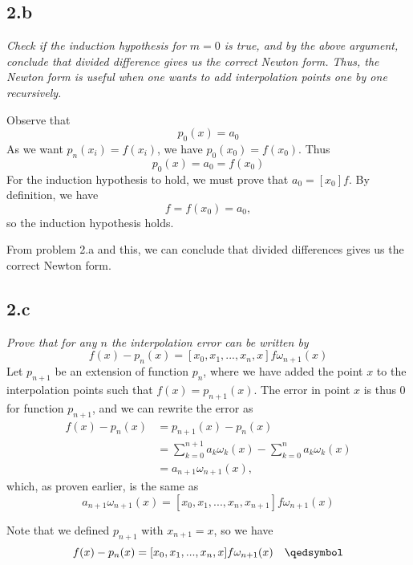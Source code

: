 \subsection{2.b}
\textit{Check if the induction hypothesis for $m = 0$ is true, and by the above argument, conclude that divided difference gives us the correct Newton form. Thus, the Newton form is useful when one wants to add interpolation points one by one recursively.}

Observe that
\begin{equation*}
    p_0(x) = a_0
\end{equation*}
As we want $p_n(x_i) = f(x_i)$, we have $p_0(x_0) = f(x_0)$. Thus
\begin{equation*}
    p_0(x) = a_0 = f(x_0)
\end{equation*}
For the induction hypothesis to hold, we must prove that $a_0 = [x_0]f$. By definition, we have
\begin{equation*}
    [x_0]f = f(x_0) = a_0,
\end{equation*}
so the induction hypothesis holds.

From problem 2.a and this, we can conclude that divided differences gives us the correct Newton form.



\subsection{2.c}
\textit{Prove that for any $n$ the interpolation error can be written by}
\begin{equation*}
    f(x) - p_n(x) = [x_0, x_1, ..., x_n, x] f \omega_{n+1}(x)
\end{equation*}
Let $p_{n+1}$ be an extension of function $p_n$, where we have added the point $x$ to the interpolation points such that $f(x) = p_{n+1}(x)$. The error in point $x$ is thus 0 for function $p_{n+1}$, and we can rewrite the error as
\begin{align*}
    f(x) - p_n(x) &= p_{n+1}(x) - p_n(x) \\
    &= \sum_{k=0}^{n+1} a_k \omega_k(x) - \sum_{k=0}^{n} a_k \omega_k(x) \\
    &= a_{n+1} \omega_{n+1}(x),
\end{align*}
which, as proven earlier, is the same as
\begin{equation*}
    a_{n+1} \omega_{n+1}(x) = [x_0, x_1, ..., x_n, x_{n+1}] f \omega_{n+1}(x)
\end{equation*}

Note that we defined $p_{n+1}$ with $x_{n+1} = x$, so we have
\begin{equation*}
    f(x) - p_n(x) = [x_0, x_1, ..., x_n, x] f \omega_{n+1}(x) \quad \qedsymbol
\end{equation*}